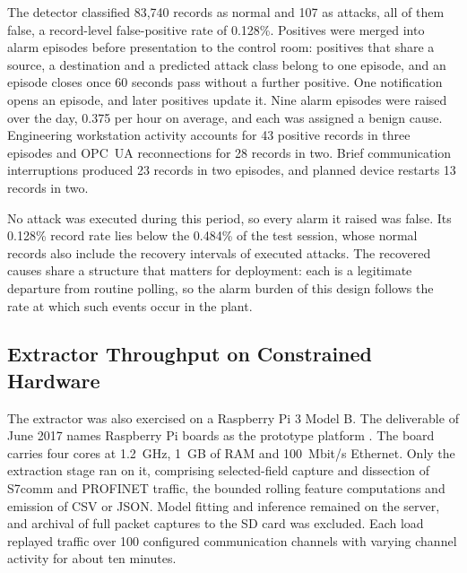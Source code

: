 The detector classified 83,740 records as normal and 107 as attacks, all of them false, a
record-level false-positive rate of 0.128\%. Positives were merged into alarm episodes
before presentation to the control room: positives that share a source, a destination and a
predicted attack class belong to one episode, and an episode closes once 60 seconds pass without
a further positive. One notification opens an episode, and later positives update it. Nine alarm
episodes were raised over the day, 0.375 per hour on average, and each was assigned a benign
cause. Engineering workstation activity accounts for 43 positive records in three episodes and
OPC~UA reconnections for 28 records in two. Brief communication interruptions produced 23
records in two episodes, and planned device restarts 13 records in two.

No attack was executed during this period, so every alarm it raised was false. Its 0.128\%
record rate lies below the 0.484\% of the test session, whose normal records also include the
recovery intervals of executed attacks. The recovered causes share a structure that
matters for deployment: each is a legitimate departure from routine polling, so the alarm burden
of this design follows the rate at which such events occur in the plant.

\subsection{Extractor Throughput on Constrained Hardware}
\label{sec:anomaly:iuno-pi}

The extractor was also exercised on a Raspberry Pi 3 Model B. The deliverable of June 2017
names Raspberry Pi boards as the prototype platform \cite{iuno2017d42}. The board carries four
cores at 1.2~GHz, 1~GB of RAM and 100~Mbit/s Ethernet. Only the extraction stage ran on it,
comprising selected-field capture and dissection of S7comm and PROFINET traffic, the bounded rolling
feature computations and emission of CSV or JSON. Model fitting and inference remained on the
server, and archival of full packet captures to the SD card was excluded. Each load replayed
traffic over 100 configured communication channels with varying channel activity for about ten
minutes.

